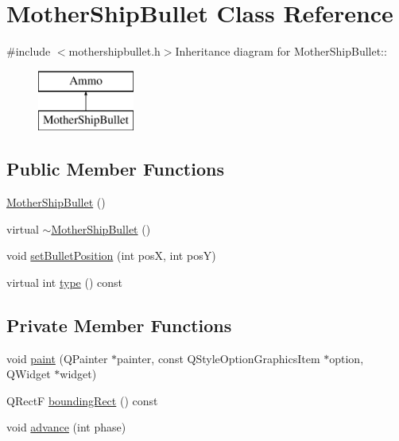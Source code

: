 \hypertarget{class_mother_ship_bullet}{
\section{MotherShipBullet Class Reference}
\label{class_mother_ship_bullet}
}


{\ttfamily \#include $<$mothershipbullet.h$>$}Inheritance diagram for MotherShipBullet::\begin{figure}[H]
\begin{center}
\leavevmode
\includegraphics[height=2cm]{class_mother_ship_bullet}
\end{center}
\end{figure}
\subsection*{Public Member Functions}
\begin{DoxyCompactItemize}
\item 
\hyperlink{class_mother_ship_bullet_a95e5f5a708ca1ce2f609c7119eab8c4e}{MotherShipBullet} ()
\item 
virtual \hyperlink{class_mother_ship_bullet_a9753e8ee030255e1edd263e00fc890e5}{$\sim$MotherShipBullet} ()
\item 
void \hyperlink{class_mother_ship_bullet_ac2165443de035034133f7f215939ef92}{setBulletPosition} (int posX, int posY)
\item 
virtual int \hyperlink{class_mother_ship_bullet_a7042b4539bd9465cf1cb9e5b9a56ddce}{type} () const 
\end{DoxyCompactItemize}
\subsection*{Private Member Functions}
\begin{DoxyCompactItemize}
\item 
void \hyperlink{class_mother_ship_bullet_a931472c711d67537e8579ff36e6c5d0c}{paint} (QPainter $\ast$painter, const QStyleOptionGraphicsItem $\ast$option, QWidget $\ast$widget)
\item 
QRectF \hyperlink{class_mother_ship_bullet_a994d08ae215b526f3bf8ccb63c6efabd}{boundingRect} () const 
\item 
void \hyperlink{class_mother_ship_bullet_a56d988809fe0613e31c09bfb73d3ba0e}{advance} (int phase)
\end{DoxyCompactItemize}
